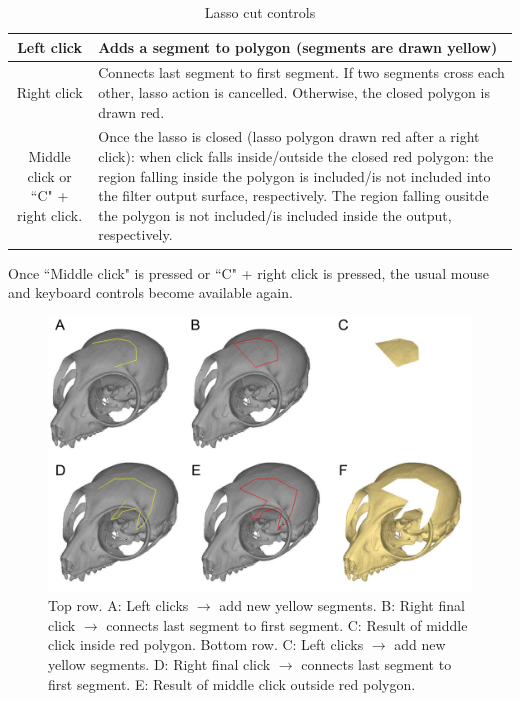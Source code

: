 \begin{table}
\begin{tabularx}{\linewidth}{ | c | X | }
\hline			
Left click & Adds a segment to polygon (segments are drawn yellow) \\ \hline			

Right click & Connects last segment to first segment. If two segments cross each other, lasso action is cancelled. Otherwise, the closed polygon is drawn red.\\ \hline			

Middle click or ``C" + right click. & Once the lasso is closed (lasso polygon drawn red
after a right click):\newline
when click falls inside/outside the closed red polygon: the region falling inside the polygon is included/is not included into the filter output surface, respectively. The region falling ousitde the polygon is not included/is included inside the output, respectively.

\\ \hline	
			

\end{tabularx}
\caption{Lasso cut controls}	
\label{lasso_cut_controls}	
\end{table}
Once ``Middle click" is pressed or ``C" + right click is pressed, the usual mouse and keyboard controls become available again.\\

\begin{figure}
  \centering
  \includegraphics[scale=0.25]{images/Edit_selected_objects/04_Lasso_cut.pdf} 
	\caption{Top row. A: Left clicks $\rightarrow$ add new yellow segments. B: Right final click $\rightarrow$ connects last segment to first segment. C: Result of middle click inside red polygon. Bottom row. C: Left clicks $\rightarrow$ add new yellow segments. D: Right final click $\rightarrow$ connects last segment to first segment. E: Result of middle click outside red polygon. }
\label{lasso_cut}
 
\end{figure}



